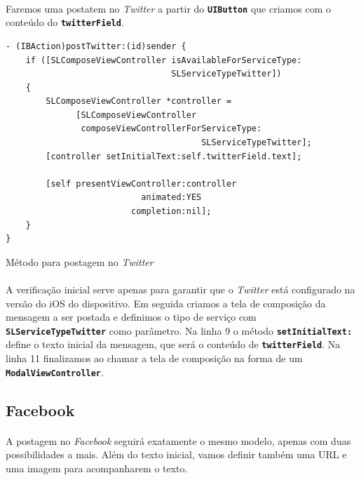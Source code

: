 \documentclass[a4paper,12pt,brazil,doubleside]{book}
\begin{document}
\begin{singlespace}
\paragraph{}Faremos uma postatem no \emph{Twitter} a partir do \texttt{\textbf{UIButton}} que criamos com o conteúdo do \texttt{\textbf{twitterField}}. 

\begin{listing}[H]
\begin{verbatim}
- (IBAction)postTwitter:(id)sender {
    if ([SLComposeViewController isAvailableForServiceType:
                                 SLServiceTypeTwitter])
    {
        SLComposeViewController *controller = 
              [SLComposeViewController
               composeViewControllerForServiceType:
                                       SLServiceTypeTwitter];
        [controller setInitialText:self.twitterField.text];
        
        [self presentViewController:controller
                           animated:YES
                         completion:nil];
    }
}
\end{verbatim}
\caption{Método para postagem no \emph{Twitter}}
\end{listing}

\paragraph{}A verificação inicial serve apenas para garantir que o \emph{Twitter} está configurado na versão do iOS do dispositivo. Em seguida criamos a tela de composição da mensagem a ser postada e definimos o tipo de serviço com \texttt{\textbf{SLServiceTypeTwitter}} como parâmetro. Na linha 9 o método \texttt{\textbf{setInitialText:}} define o texto inicial da mensagem, que será o conteúdo de \texttt{\textbf{twitterField}}. Na linha 11 finalizamos ao chamar a tela de composição na forma de um \texttt{\textbf{ModalViewController}}.

\bigskip

\subsection{Facebook}

\paragraph{}A postagem no \emph{Facebook} seguirá exatamente o mesmo modelo, apenas com duas possibilidades a mais. Além do texto inicial, vamos definir também uma URL e uma imagem para acompanharem o texto.


\end{singlespace}
\end{document}
